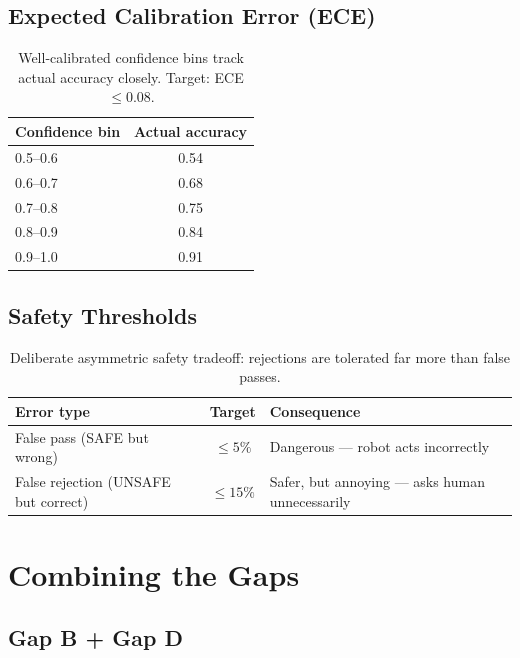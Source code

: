 \documentclass[11pt,a4paper]{article}
\begin{document}
\subsection{Expected Calibration Error (ECE)}

\begin{table}[h]
\centering
\begin{tabular}{lc}
\toprule
\textbf{Confidence bin} & \textbf{Actual accuracy} \\
\midrule
0.5--0.6 & 0.54 \\
0.6--0.7 & 0.68 \\
0.7--0.8 & 0.75 \\
0.8--0.9 & 0.84 \\
0.9--1.0 & 0.91 \\
\bottomrule
\end{tabular}
\caption{Well-calibrated confidence bins track actual accuracy closely. Target: ECE $\leq 0.08$.}
\end{table}

\subsection{Safety Thresholds}

\begin{table}[h]
\centering
\begin{tabular}{lcl}
\toprule
\textbf{Error type} & \textbf{Target} & \textbf{Consequence} \\
\midrule
False pass (SAFE but wrong) & $\leq 5\%$ & Dangerous --- robot acts incorrectly \\
False rejection (UNSAFE but correct) & $\leq 15\%$ & Safer, but annoying --- asks human unnecessarily \\
\bottomrule
\end{tabular}
\caption{Deliberate asymmetric safety tradeoff: rejections are tolerated far more than false passes.}
\end{table}

\section{Combining the Gaps}
\label{sec:combine}

\subsection{Gap B + Gap D}
\end{document}

